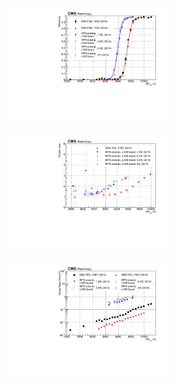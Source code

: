 	\begin{figure}[H]
		\begin{subfigure}{.5\linewidth}
		    \centering
			\includegraphics[width=\linewidth]{fig/chapt6/INFN-LVDS-Eff-Shift.pdf}
			\caption{\label{fig:INFN-FEB:A}}
		\end{subfigure}
		\begin{subfigure}{.5\linewidth}
		    \centering
			\includegraphics[width = \linewidth]{fig/chapt6/INFN-LVDS-ClS-Shift.pdf}
			\caption{\label{fig:INFN-FEB:B}}
		\end{subfigure}
		\begin{subfigure}{\linewidth}
		    \centering
			\includegraphics[width = .5\linewidth]{fig/chapt6/INFN-LVDS-Rate-Shift.pdf}

\end{subfigure}
\end{figure}
